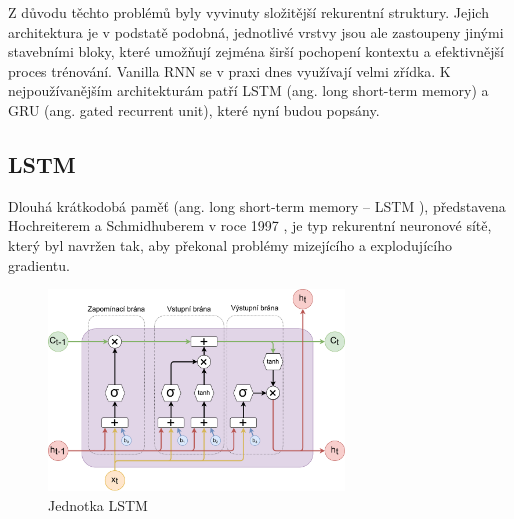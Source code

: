 
Z důvodu těchto problémů byly vyvinuty složitější rekurentní struktury. Jejich
architektura je v podstatě podobná, jednotlivé vrstvy jsou ale zastoupeny
jinými stavebními bloky, které umožňují zejména širší pochopení kontextu a
efektivnější proces trénování. Vanilla RNN se v praxi dnes využívají velmi
zřídka. K nejpoužívanějším architekturám patří LSTM (ang. long short-term
memory) a GRU (ang. gated recurrent unit), které nyní budou popsány.

\subsection{LSTM}

Dlouhá krátkodobá paměť (ang. long short-term memory – LSTM ), představena
Hochreiterem a Schmidhuberem v roce 1997 \cite{lstm}, je typ rekurentní
neuronové sítě, který byl navržen tak, aby překonal problémy mizejícího a
explodujícího gradientu.

\begin{figure}[]
    \centering
    \includegraphics[width=0.7\textwidth]{Figures/LSTM_unit.pdf}
    \caption{Jednotka LSTM}
    \label{fig:lstm}
\end{figure}

